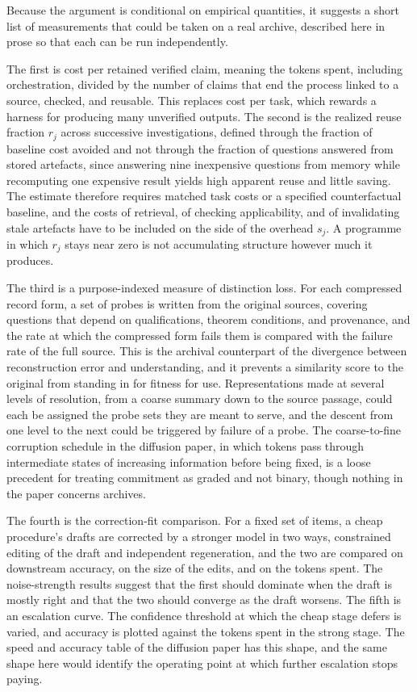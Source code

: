 \documentclass[11pt]{article}
\theoremstyle{remark}
\begin{document}
Because the argument is conditional on empirical quantities, it suggests a short list of measurements that could be taken on a real archive, described here in prose so that each can be run independently.

The first is cost per retained verified claim, meaning the tokens spent, including orchestration, divided by the number of claims that end the process linked to a source, checked, and reusable. This replaces cost per task, which rewards a harness for producing many unverified outputs. The second is the realized reuse fraction $r_j$ across successive investigations, defined through the fraction of baseline cost avoided and not through the fraction of questions answered from stored artefacts, since answering nine inexpensive questions from memory while recomputing one expensive result yields high apparent reuse and little saving. The estimate therefore requires matched task costs or a specified counterfactual baseline, and the costs of retrieval, of checking applicability, and of invalidating stale artefacts have to be included on the side of the overhead $s_j$. A programme in which $r_j$ stays near zero is not accumulating structure however much it produces.

The third is a purpose-indexed measure of distinction loss. For each compressed record form, a set of probes is written from the original sources, covering questions that depend on qualifications, theorem conditions, and provenance, and the rate at which the compressed form fails them is compared with the failure rate of the full source. This is the archival counterpart of the divergence between reconstruction error and understanding, and it prevents a similarity score to the original from standing in for fitness for use. Representations made at several levels of resolution, from a coarse summary down to the source passage, could each be assigned the probe sets they are meant to serve, and the descent from one level to the next could be triggered by failure of a probe. The coarse-to-fine corruption schedule in the diffusion paper, in which tokens pass through intermediate states of increasing information before being fixed, is a loose precedent for treating commitment as graded and not binary, though nothing in the paper concerns archives.

The fourth is the correction-fit comparison. For a fixed set of items, a cheap procedure's drafts are corrected by a stronger model in two ways, constrained editing of the draft and independent regeneration, and the two are compared on downstream accuracy, on the size of the edits, and on the tokens spent. The noise-strength results suggest that the first should dominate when the draft is mostly right and that the two should converge as the draft worsens. The fifth is an escalation curve. The confidence threshold at which the cheap stage defers is varied, and accuracy is plotted against the tokens spent in the strong stage. The speed and accuracy table of the diffusion paper has this shape, and the same shape here would identify the operating point at which further escalation stops paying.
\end{document}
